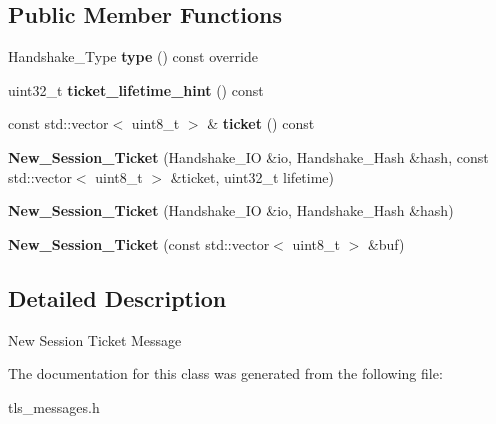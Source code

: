 \subsection*{Public Member Functions}
\begin{DoxyCompactItemize}
\item 
\mbox{\label{class_botan_1_1_t_l_s_1_1_new___session___ticket_a0b946a9fcc8451809169dcf1a48d1992}} 
Handshake\+\_\+\+Type {\bfseries type} () const override
\item 
\mbox{\label{class_botan_1_1_t_l_s_1_1_new___session___ticket_ad595f84713fd3c08706953a905c0982e}} 
uint32\+\_\+t {\bfseries ticket\+\_\+lifetime\+\_\+hint} () const
\item 
\mbox{\label{class_botan_1_1_t_l_s_1_1_new___session___ticket_a459f4239e5cf5d5d2e30d55bc64e6ff2}} 
const std\+::vector$<$ uint8\+\_\+t $>$ \& {\bfseries ticket} () const
\item 
\mbox{\label{class_botan_1_1_t_l_s_1_1_new___session___ticket_ac911079cf8e83c39e9fd2a0b0364e2d9}} 
{\bfseries New\+\_\+\+Session\+\_\+\+Ticket} (Handshake\+\_\+\+IO \&io, Handshake\+\_\+\+Hash \&hash, const std\+::vector$<$ uint8\+\_\+t $>$ \&ticket, uint32\+\_\+t lifetime)
\item 
\mbox{\label{class_botan_1_1_t_l_s_1_1_new___session___ticket_ad2c54684e67deadda3d664b13a0d25a9}} 
{\bfseries New\+\_\+\+Session\+\_\+\+Ticket} (Handshake\+\_\+\+IO \&io, Handshake\+\_\+\+Hash \&hash)
\item 
\mbox{\label{class_botan_1_1_t_l_s_1_1_new___session___ticket_a0019e165e0310496616914de0308a164}} 
{\bfseries New\+\_\+\+Session\+\_\+\+Ticket} (const std\+::vector$<$ uint8\+\_\+t $>$ \&buf)
\end{DoxyCompactItemize}


\subsection{Detailed Description}
New Session Ticket Message 

The documentation for this class was generated from the following file\+:\begin{DoxyCompactItemize}
\item 
tls\+\_\+messages.\+h\end{DoxyCompactItemize}
